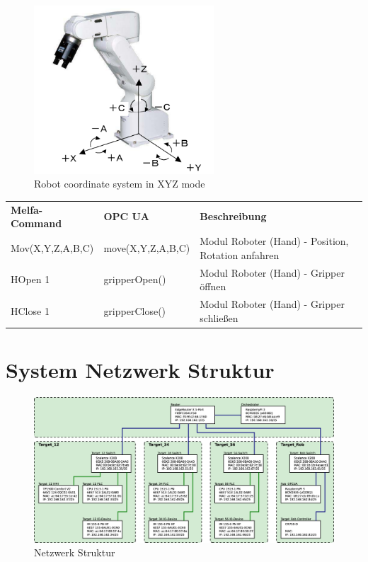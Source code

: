 \documentclass[11pt,a4paper,ngerman]{article}
\begin{document}
\begin{figure}[htp]
	\centering
	\includegraphics[width=0.6\textwidth]{images/robot_axis.png}
	\caption{Robot coordinate system in XYZ mode}
	\label{fig:robot_axis}
\end{figure}

\begin{center}
	\setlength\extrarowheight{4pt}
	\small
	
	\begin{tabularx}{\textwidth}{|p{3cm}|p{4cm}|X|}
		\hline
		\rowcolor{tublau}
		\multicolumn{3}{|c|}{\bf \color{white} \large Gripper}\\
		\hline\hline
		\rowcolor{gray!80}
		\bf Melfa-Command & \bf OPC UA & \bf Beschreibung\\
		\hline\hline
		Mov(X,Y,Z,A,B,C) & move(X,Y,Z,A,B,C) & Modul Roboter (Hand) - Position, Rotation anfahren\\
		HOpen 1 & gripperOpen() & Modul Roboter (Hand) - Gripper öffnen\\
		HClose 1 & gripperClose() & Modul Roboter (Hand) - Gripper schließen\\
		\hline
	\end{tabularx}
\end{center}



\section{System Netzwerk Struktur}
\begin{figure}[!htb]
	\centering
	\includegraphics[width=.99\linewidth]{images/Network_Structure}
	\caption{Netzwerk Struktur}
	\label{fig_network_structure}
\end{figure}




\newpage
%
%

\makelast
\end{document}
